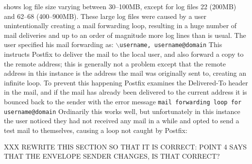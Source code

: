  shows log
file size varying between 30--100MB, except for log files 22 (200MB) and
62--68 (400--900MB).  These large log files were caused by a user
unintentionally creating a mail forwarding loop, resulting in a huge number
of mail deliveries and up to an order of magnitude more log lines than is
usual.  The user specified his mail forwarding as: \newline{}
\tab{}\texttt{$\backslash$username, username@domain} \newline{} This
instructs Postfix to deliver the mail to the local user, and also forward a
copy to the remote address; this is generally not a problem except that the
remote address in this instance is the address the mail was originally sent
to, creating an infinite loop.  To prevent this happening Postfix examines
the Delivered-To header in the mail, and if the mail has already been
delivered to the current address it is bounced back to the sender with the
error message \newline{} \tab{} \texttt{mail forwarding loop for
username@domain}\newline{}  Ordinarily this works well, but unfortunately
in this instance the user noticed they had not received any mail in a while
and opted to send a test mail to themselves, causing a loop not caught by
Postfix:

XXX REWRITE THIS SECTION SO THAT IT IS CORRECT\@: POINT 4 SAYS THAT THE
ENVELOPE SENDER CHANGES, IS THAT CORRECT\@?

